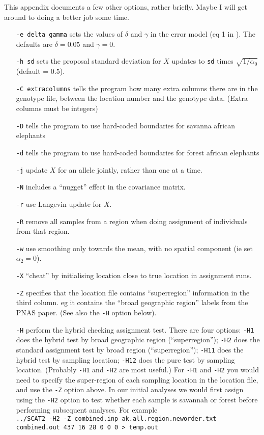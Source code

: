 \documentclass[11pt,titlepage,times,letterpaper]{article}
\begin{document}
This appendix documents a few other options, rather briefly.  Maybe I
will get around to doing a better job some time.
\begin{enumerate}[{\tt -f}]
\item[{\tt -e delta gamma}] sets the values of $\delta$ and $\gamma$
in the error model (eq 1 in \cite{wasser.etal.04}). The defaults are
$\delta = 0.05$ and $\gamma = 0$.  
\item[{\tt -h sd}] sets the
proposal standard deviation for $X$ updates to {\tt sd} times
$\sqrt{1/\alpha_0}$ (default = 0.5).  
\item[{\tt -C extracolumns}] tells the program how many extra columns there
are in the genotype file, between the location number and the genotype
data. (Extra columns must be integers)
\item[{\tt -D}] tells the program to use hard-coded boundaries for savanna african elephants
\item[{\tt -d}] tells the program to use hard-coded boundaries for forest african elephants
\item[{\tt -j}] update $X$ for an allele jointly, rather than one at a time.
\item[{\tt -N}] includes a
``nugget'' effect in the covariance matrix.  
\item[{\tt -r}] use Langevin update for $X$.  
\item[{\tt -R}] remove
all samples from a region when doing assignment of individuals from
that region.
\item[{\tt -w}] use smoothing only towards the mean, with no spatial component (ie set
$\alpha_2 = 0$).
\item[{\tt -X}] ``cheat'' by initialising location close to true location in assignment runs.
\item[{\tt -Z}] specifies that the location file contains ``superregion'' information in the third column.
eg it contains the ``broad geographic region'' labels from the PNAS paper. (See also the {\tt -H} option below).
\item[{\tt -H}] perform the hybrid checking assignment test. There are
four options: {\tt -H1} does the hybrid test by broad geographic
region (``superregion''); {\tt -H2} does the standard assignment test
by broad region (``superregion''); {\tt -H11} does the hybrid test by
sampling location; {\tt -H12} does the pure test by sampling
location. (Probably {\tt -H1} and {\tt -H2} are most useful.)  For {\tt -H1} and {\tt -H2} you would need to specify the super-region of
each sampling location in the location file, and use the {\tt -Z} option above. In our
initial analyses we would first assign using the {\tt -H2} option to test
whether each sample is savannah or forest before performing subsequent analyses.
For example \\ {\tt ../SCAT2 -H2 -Z combined.inp ak.all.region.neworder.txt combined.out 437 16 28 0 0 0 > temp.out}


\end{enumerate}
\end{document}
